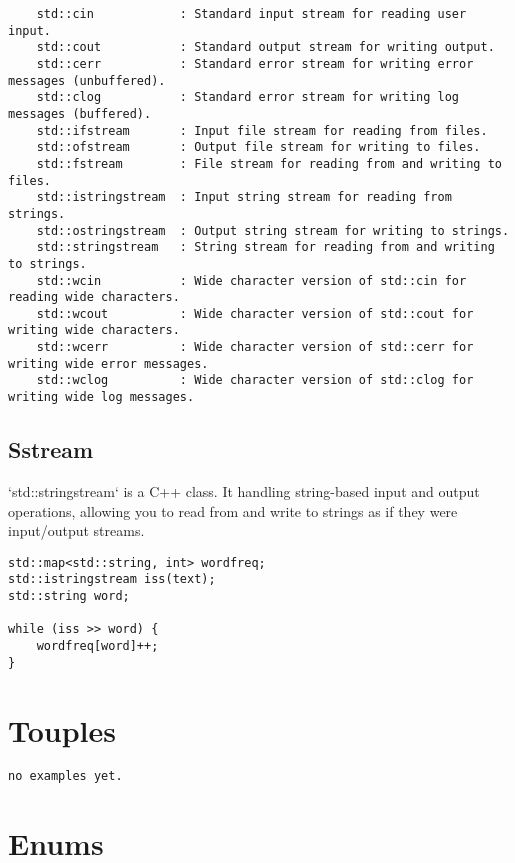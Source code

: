 \begin{verbatim}
    std::cin            : Standard input stream for reading user input.
    std::cout           : Standard output stream for writing output.
    std::cerr           : Standard error stream for writing error messages (unbuffered).
    std::clog           : Standard error stream for writing log messages (buffered).
    std::ifstream       : Input file stream for reading from files.
    std::ofstream       : Output file stream for writing to files.
    std::fstream        : File stream for reading from and writing to files.
    std::istringstream  : Input string stream for reading from strings.
    std::ostringstream  : Output string stream for writing to strings.
    std::stringstream   : String stream for reading from and writing to strings.
    std::wcin           : Wide character version of std::cin for reading wide characters.
    std::wcout          : Wide character version of std::cout for writing wide characters.
    std::wcerr          : Wide character version of std::cerr for writing wide error messages.
    std::wclog          : Wide character version of std::clog for writing wide log messages.
\end{verbatim}

\subsection{Sstream}

`std::stringstream` is a C++ class. It handling string-based input and output operations,
allowing you to read from and write to strings as if they were input/output streams.

\begin{verbatim}
std::map<std::string, int> wordfreq;
std::istringstream iss(text);
std::string word;

while (iss >> word) {
    wordfreq[word]++;
}
\end{verbatim}

\section{Touples}

\begin{verbatim}
no examples yet.
\end{verbatim}


\section{Enums}

